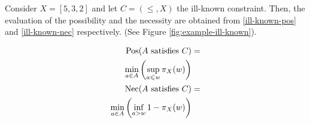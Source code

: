 \begin{example}
Consider  $X = \left[5, 3, 2 \right]$ and let $C =(\leq, X)$ the ill-known constraint. Then, the evaluation of the possibility and the necessity are obtained from \eqref{ill-known-pos} and \eqref{ill-known-nec} respectively. (See Figure \ref{fig:example-ill-known}).






 
\begin{align}
\operatorname{Pos}(A\text{ satisfies }C) & =\\
\nonumber
\min_{a \in A}\left(\sup_{a \leqslant w}\pi_{X}(w)\right)\\
\operatorname{Nec}(A\text{ satisfies }C) & =\\
\nonumber
\min_{a \in A}\left(\inf_{a > w} 1-\pi_{X}(w)\right) 
\end{align}




\end{example}





